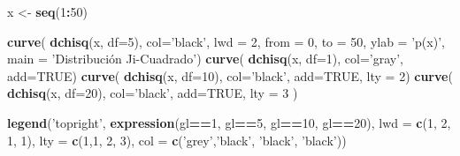 \documentclass[]{article}
\newenvironment{Shaded}{\begin{snugshade}}{\end{snugshade}}
\newcommand{\DataTypeTok}[1]{\textcolor[rgb]{0.13,0.29,0.53}{#1}}
\newcommand{\DecValTok}[1]{\textcolor[rgb]{0.00,0.00,0.81}{#1}}
\newcommand{\KeywordTok}[1]{\textcolor[rgb]{0.13,0.29,0.53}{\textbf{#1}}}
\newcommand{\NormalTok}[1]{#1}
\newcommand{\OperatorTok}[1]{\textcolor[rgb]{0.81,0.36,0.00}{\textbf{#1}}}
\newcommand{\OtherTok}[1]{\textcolor[rgb]{0.56,0.35,0.01}{#1}}
\newcommand{\StringTok}[1]{\textcolor[rgb]{0.31,0.60,0.02}{#1}}
\begin{document}
\begin{Shaded}
\begin{Highlighting}[]
\NormalTok{x <-}\StringTok{ }\KeywordTok{seq}\NormalTok{(}\DecValTok{1}\OperatorTok{:}\DecValTok{50}\NormalTok{)}

\KeywordTok{curve}\NormalTok{( }\KeywordTok{dchisq}\NormalTok{(x, }\DataTypeTok{df=}\DecValTok{5}\NormalTok{), }\DataTypeTok{col=}\StringTok{'black'}\NormalTok{, }\DataTypeTok{lwd =} \DecValTok{2}\NormalTok{,}
       \DataTypeTok{from =} \DecValTok{0}\NormalTok{, }\DataTypeTok{to =} \DecValTok{50}\NormalTok{,}
       \DataTypeTok{ylab =} \StringTok{'p(x)'}\NormalTok{,}
       \DataTypeTok{main =} \StringTok{'Distribución Ji-Cuadrado'}\NormalTok{)}
\KeywordTok{curve}\NormalTok{( }\KeywordTok{dchisq}\NormalTok{(x, }\DataTypeTok{df=}\DecValTok{1}\NormalTok{), }\DataTypeTok{col=}\StringTok{'gray'}\NormalTok{, }\DataTypeTok{add=}\OtherTok{TRUE}\NormalTok{)}
\KeywordTok{curve}\NormalTok{( }\KeywordTok{dchisq}\NormalTok{(x, }\DataTypeTok{df=}\DecValTok{10}\NormalTok{), }\DataTypeTok{col=}\StringTok{'black'}\NormalTok{, }\DataTypeTok{add=}\OtherTok{TRUE}\NormalTok{, }\DataTypeTok{lty =} \DecValTok{2}\NormalTok{)}
\KeywordTok{curve}\NormalTok{( }\KeywordTok{dchisq}\NormalTok{(x, }\DataTypeTok{df=}\DecValTok{20}\NormalTok{), }\DataTypeTok{col=}\StringTok{'black'}\NormalTok{, }\DataTypeTok{add=}\OtherTok{TRUE}\NormalTok{, }\DataTypeTok{lty =} \DecValTok{3}\NormalTok{ )}

\KeywordTok{legend}\NormalTok{(}\StringTok{'topright'}\NormalTok{, }
      \KeywordTok{expression}\NormalTok{(gl}\OperatorTok{==}\DecValTok{1}\NormalTok{, gl}\OperatorTok{==}\DecValTok{5}\NormalTok{, gl}\OperatorTok{==}\DecValTok{10}\NormalTok{, gl}\OperatorTok{==}\DecValTok{20}\NormalTok{),}
      \DataTypeTok{lwd =} \KeywordTok{c}\NormalTok{(}\DecValTok{1}\NormalTok{, }\DecValTok{2}\NormalTok{, }\DecValTok{1}\NormalTok{, }\DecValTok{1}\NormalTok{),}
      \DataTypeTok{lty =} \KeywordTok{c}\NormalTok{(}\DecValTok{1}\NormalTok{,}\DecValTok{1}\NormalTok{, }\DecValTok{2}\NormalTok{, }\DecValTok{3}\NormalTok{),}
      \DataTypeTok{col =} \KeywordTok{c}\NormalTok{(}\StringTok{'grey'}\NormalTok{,}\StringTok{'black'}\NormalTok{, }\StringTok{'black'}\NormalTok{, }\StringTok{'black'}\NormalTok{))}
\end{Highlighting}
\end{Shaded}
\end{document}
